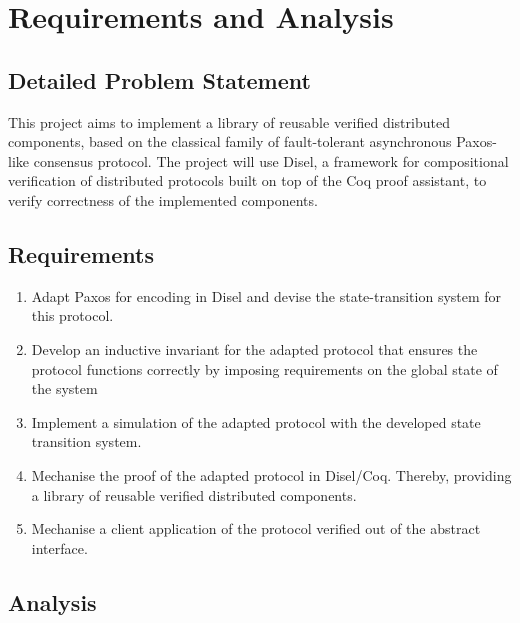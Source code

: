 \chapter{Requirements and Analysis}

\section{Detailed Problem Statement}
This project aims to implement a library of reusable verified distributed components,
based on the classical family of fault-tolerant asynchronous Paxos-like consensus protocol.
The project will use Disel, a framework for compositional verification of distributed
protocols built on top of the Coq proof assistant, to verify correctness of the
implemented components.

\section{Requirements}
\begin{enumerate}
  \item Adapt Paxos for encoding in Disel and devise the state-transition system for this protocol.
  \item Develop an inductive invariant for the adapted protocol that
    ensures the protocol functions correctly by imposing requirements on the global state of the system
  \item Implement a simulation of the adapted protocol with the developed state transition system.
  \item Mechanise the proof of the adapted protocol in Disel/Coq.
    Thereby, providing a library of reusable verified distributed components.
  \item Mechanise a client application of the protocol verified out of the abstract interface.
\end{enumerate}

\vspace{-5mm}
\section{Analysis}



